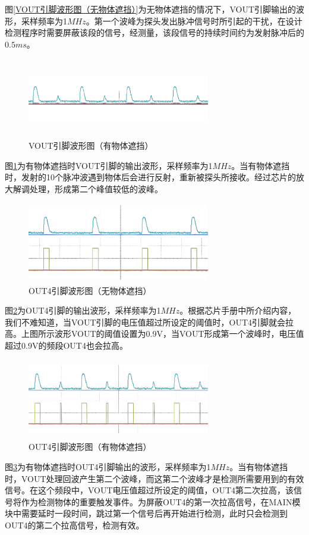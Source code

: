  图\ref{VOUT引脚波形图（无物体遮挡）}为无物体遮挡的情况下，VOUT引脚输出的波形，采样频率为1$MHz$。第一个波峰为探头发出脉冲信号时所引起的干扰，在设计检测程序时需要屏蔽该段的信号，经测量，该段信号的持续时间约为发射脉冲后的$0.5ms$。
 \begin{figure}[!h]
	    \centering
	    \includegraphics[width=8cm,height=3.5cm]{figure/debug waveform6.png}
	    \caption{VOUT引脚波形图（有物体遮挡）}
	    \label{VOUT引脚波形图（有物体遮挡）}
	\end{figure}\par
 图\ref{VOUT引脚波形图（有物体遮挡）}为有物体遮挡时VOUT引脚的输出波形，采样频率为1$MHz$。当有物体遮挡时，发射的10个脉冲波遇到物体后会进行反射，重新被探头所接收。经过芯片的放大解调处理，形成第二个峰值较低的波峰。
 \begin{figure}[!h]
	    \centering
	    \includegraphics[width=8cm,height=3.5cm]{figure/debug waveform7.png}
	    \caption{OUT4引脚波形图（无物体遮挡）}
	    \label{OUT4引脚波形图（无物体遮挡）}
	\end{figure}\par
 图\ref{OUT4引脚波形图（无物体遮挡）}为OUT4引脚的输出波形，采样频率为1$MHz$。根据芯片手册中所介绍内容，我们不难知道，当VOUT引脚的电压值超过所设定的阈值时，OUT4引脚就会拉高。上图所示波形VOUT的阈值设置为0.9V，当VOUT形成第一个波峰时，电压值超过0.9V的频段OUT4也会拉高。
 \newpage
 \begin{figure}[!h]
	    \centering
	    \includegraphics[width=8cm,height=3.5cm]{figure/debug wave form8.png}
	    \caption{OUT4引脚波形图（有物体遮挡）}
	    \label{OUT4引脚波形图（有物体遮挡）}
	\end{figure}\par
 图\ref{OUT4引脚波形图（有物体遮挡）}为有物体遮挡时OUT4引脚输出的波形，采样频率为1$MHz$。当有物体遮挡时，VOUT处理回波产生第二个波峰，而这第二个波峰才是检测所需要用到的有效信号。在这个频段中，VOUT电压值超过所设定的阈值，OUT4第二次拉高，该信号将作为检测物体的重要触发事件。为屏蔽OUT4的第一次拉高信号，在MAIN模块中需要延时一段时间，跳过第一个信号后再开始进行检测，此时只会检测到OUT4的第二个拉高信号，检测有效。

